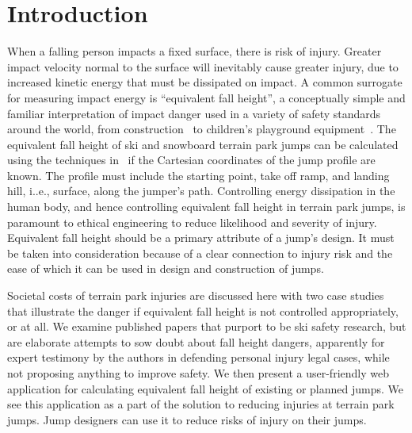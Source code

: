 \documentclass[smallextended]{svjour3}       %
\begin{document}
\section{Introduction}
\label{intro}
%
When a falling person impacts a fixed surface, there is risk of injury. Greater
impact velocity normal to the surface will inevitably cause greater injury, due
to increased kinetic energy that must be dissipated on impact. A common
surrogate for measuring impact energy is ``equivalent fall height'', a
conceptually simple and familiar interpretation of impact danger used in a
variety of safety standards around the world, from construction~\cite{OSHA2021}
to children's playground equipment~\cite{Chalmers1996}. The equivalent fall
height of ski and snowboard terrain park jumps can be
calculated using the techniques in~\cite{McNeil2012} if the Cartesian coordinates of the jump profile
are known. The profile must include the starting point, take off ramp, and landing hill, i..e., surface,  along
the jumper's path. Controlling energy dissipation in the human body, and hence
controlling equivalent fall height in terrain park jumps, is paramount to ethical engineering to reduce likelihood and severity of injury. Equivalent fall
height should be a primary attribute of a jump's design. It must be taken into
consideration because of a clear connection to injury risk and the ease of
which it can be used in design and construction of jumps.

Societal costs of terrain park injuries are discussed here with two case studies that illustrate the danger if equivalent fall
height is not controlled appropriately, or at all. We examine published papers
that purport to be ski safety research, but are elaborate attempts to sow doubt about fall height dangers, apparently for expert testimony by the authors in defending personal injury legal cases, while not proposing anything to improve safety. We then present a user-friendly web application for
calculating equivalent fall height of existing or planned jumps. We see this
application as a part of the solution to reducing injuries at terrain park
jumps. Jump designers can use it to reduce risks of injury on their jumps.
\end{document}
